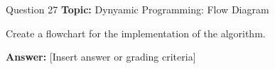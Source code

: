 \begin{frame}{Question 27}
    \textbf{Topic:} Dynyamic Programming: Flow Diagram

    \vspace{10pt}
    Create a flowchart for the implementation of the algorithm. 
    \vspace{20pt}

    \textbf{Answer:} [Insert answer or grading criteria]
\end{frame}

